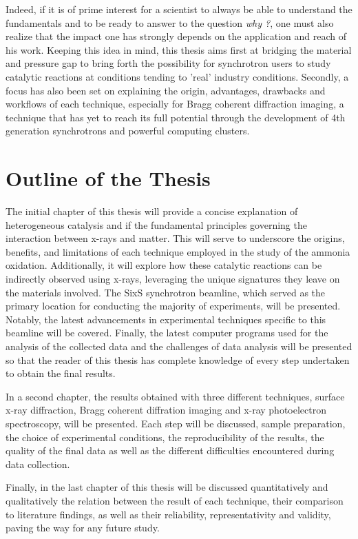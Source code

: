 Indeed, if it is of prime interest for a scientist to always be able to understand the fundamentals and to be ready to answer to the question \textit{why ?}, one must also realize that the impact one has strongly depends on the application and reach of his work.
Keeping this idea in mind, this thesis aims first at bridging the material and pressure gap to bring forth the possibility for synchrotron users to study catalytic reactions at conditions tending to 'real' industry conditions.
Secondly, a focus has also been set on explaining the origin, advantages, drawbacks and workflows of each technique, especially for Bragg coherent diffraction imaging, a technique that has yet to reach its full potential through the development of 4th generation synchrotrons and powerful computing clusters.

\section{Outline of the Thesis}

The initial chapter of this thesis will provide a concise explanation of heterogeneous catalysis and if the fundamental principles governing the interaction between x-rays and matter.
This will serve to underscore the origins, benefits, and limitations of each technique employed in the study of the ammonia oxidation.
Additionally, it will explore how these catalytic reactions can be indirectly observed using x-rays, leveraging the unique signatures they leave on the materials involved.
The SixS synchrotron beamline, which served as the primary location for conducting the majority of experiments, will be presented.
Notably, the latest advancements in experimental techniques specific to this beamline will be covered.
Finally, the latest computer programs used for the analysis of the collected data and the challenges of data analysis will be presented so that the reader of this thesis has complete knowledge of every step undertaken to obtain the final results.

In a second chapter, the results obtained with three different techniques, surface x-ray diffraction, Bragg coherent diffration imaging and x-ray photoelectron spectroscopy, will be presented.
Each step will be discussed, sample preparation, the choice of experimental conditions, the reproducibility of the results, the quality of the final data as well as the different difficulties encountered during data collection.

Finally, in the last chapter of this thesis will be discussed quantitatively and qualitatively the relation between the result of each technique, their comparison to literature findings, as well as their reliability, representativity and validity, paving the way for any future study.
